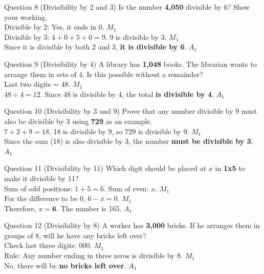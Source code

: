 \documentclass[12pt, a4paper, oneside]{article}
\begin{document}
\begin{solvingbox}{Question 8 (Divisibility by 2 and 3)}
Is the number \textbf{4,050} divisible by 6? Show your working. \\
Divisible by 2: Yes, it ends in 0. \hfill $M_1$ \\
Divisible by 3: $4+0+5+0 = 9$. 9 is divisible by 3. \hfill $M_1$ \\
Since it is divisible by both 2 and 3, \textbf{it is divisible by 6}. \hfill $A_1$
\end{solvingbox}

\begin{solvingbox}{Question 9 (Divisibility by 4)}
A library has \textbf{1,048} books. The librarian wants to arrange them in sets of 4. Is this possible without a remainder? \\
Last two digits = 48. \hfill $M_1$ \\
$48 \div 4 = 12$. Since 48 is divisible by 4, the total \textbf{is divisible by 4}. \hfill $A_1$
\end{solvingbox}

\begin{solvingbox}{Question 10 (Divisibility by 3 and 9)}
Prove that any number divisible by 9 must also be divisible by 3 using \textbf{729} as an example. \\
$7+2+9 = 18$. 18 is divisible by 9, so 729 is divisible by 9. \hfill $M_1$ \\
Since the sum (18) is also divisible by 3, the number \textbf{must be divisible by 3}. \hfill $A_1$
\end{solvingbox}

\begin{solvingbox}{Question 11 (Divisibility by 11)}
Which digit should be placed at $x$ in \textbf{1x5} to make it divisible by 11? \\
Sum of odd positions: $1 + 5 = 6$. Sum of even: $x$. \hfill $M_1$ \\
For the difference to be 0, $6 - x = 0$. \hfill $M_1$ \\
Therefore, $x = \mathbf{6}$. The number is 165. \hfill $A_1$
\end{solvingbox}

\begin{solvingbox}{Question 12 (Divisibility by 8)}
A worker has \textbf{3,000} bricks. If he arranges them in groups of 8, will he have any bricks left over? \\
Check last three digits: 000. \hfill $M_1$ \\
Rule: Any number ending in three zeros is divisible by 8. \hfill $M_1$ \\
No, there will be \textbf{no bricks left over}. \hfill $A_1$
\end{solvingbox}
\end{document}
